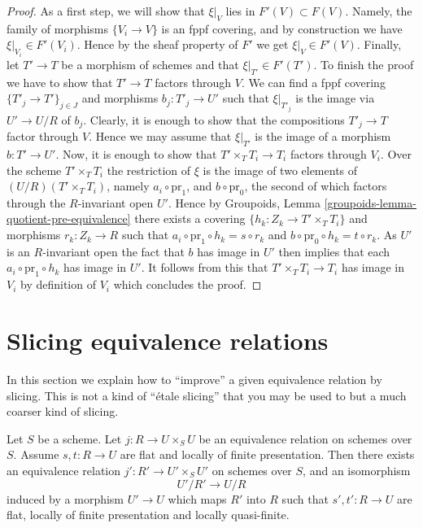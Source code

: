 \begin{proof}
\medskip\noindent
As a first step, we will show that $\xi|_V$ lies in $F'(V) \subset F(V)$.
Namely, the family of morphisms $\{V_i \to V\}$ is an fppf covering,
and by construction we have $\xi|_{V_i} \in F'(V_i)$.
Hence by the sheaf property of $F'$ we get $\xi|_V \in F'(V)$.
Finally, let $T' \to T$ be a morphism of schemes and
that $\xi|_{T'} \in F'(T')$. To finish the proof we have to show that
$T' \to T$ factors through $V$.
We can find a fppf covering $\{T'_j \to T'\}_{j \in J}$ and morphisms
$b_j : T'_j \to U'$ such that $\xi|_{T'_j}$ is the image via
$U' \to U/R$ of $b_j$. Clearly, it is enough to show that the compositions
$T'_j \to T$ factor through $V$. Hence we may assume that $\xi|_{T'}$
is the image of a morphism $b : T' \to U'$. Now, it is enough to show
that $T'\times_T T_i \to T_i$ factors through $V_i$. Over the scheme
$T' \times_T T_i$ the restriction of $\xi$ is the image of two
elements of $(U/R)(T' \times_T T_i)$, namely $a_i \circ \text{pr}_1$, and
$b \circ \text{pr}_0$, the second of which factors through the $R$-invariant
open $U'$. Hence by
Groupoids, Lemma \ref{groupoids-lemma-quotient-pre-equivalence}
there exists a covering $\{h_k : Z_k \to T' \times_T T_i\}$ and morphisms
$r_k : Z_k \to R$ such that $a_i \circ \text{pr}_1 \circ h_k = s \circ r_k$
and $b \circ \text{pr}_0 \circ h_k = t \circ r_k$. As $U'$ is an $R$-invariant
open the fact that $b$ has image in $U'$ then implies that each
$a_i \circ \text{pr}_1 \circ h_k$ has image in $U'$. It follows from this
that $T' \times_T T_i \to T_i$ has image in $V_i$ by definition of $V_i$
which concludes the proof.
\end{proof}












\section{Slicing equivalence relations}
\label{section-slicing}

\noindent
In this section we explain how to ``improve'' a given equivalence
relation by slicing. This is not a kind of ``\'etale slicing'' that you
may be used to but a much coarser kind of slicing.


\begin{lemma}
\label{lemma-slice-equivalence-relation}
Let $S$ be a scheme.
Let $j : R \to U \times_S U$ be an equivalence relation on schemes over $S$.
Assume $s, t : R \to U$ are flat and locally of finite presentation.
Then there exists an equivalence relation $j' : R' \to U'\times_S U'$
on schemes over $S$, and an isomorphism
$$
U'/R' \longrightarrow U/R
$$
induced by a morphism $U' \to U$ which maps $R'$ into $R$ such that
$s', t' : R \to U$ are flat, locally of finite presentation
and locally quasi-finite.
\end{lemma}


